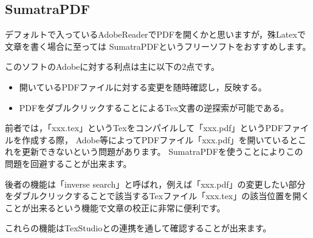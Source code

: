 \documentclass[a4paper,10pt,twocolumn,fleqn]{jarticle}
\begin{document}
\subsection{SumatraPDF}
デフォルトで入っているAdobeReaderでPDFを開くかと思いますが，殊Latexで文章を書く場合に至っては
SumatraPDFというフリーソフトをおすすめします。

このソフトのAdobeに対する利点は主に以下の2点です。
\begin{itemize}
	\item 開いているPDFファイルに対する変更を随時確認し，反映する。
	\item PDFをダブルクリックすることによるTex文書の逆探索が可能である。
\end{itemize}
前者では，「xxx.tex」というTexをコンパイルして「xxx.pdf」というPDFファイルを作成する際，
Adobe等によってPDFファイル「xxx.pdf」を開いているとこれを更新できないという問題があります。
SumatraPDFを使うことによりこの問題を回避することが出来ます。

後者の機能は「inverse search」と呼ばれ，例えば「xxx.pdf」の変更したい部分をダブルクリックすることで該当するTexファイル「xxx.tex」の該当位置を開くことが出来るという機能で文章の校正に非常に便利です。

これらの機能はTexStudioとの連携を通して確認することが出来ます。


\section{}
\end{document}
